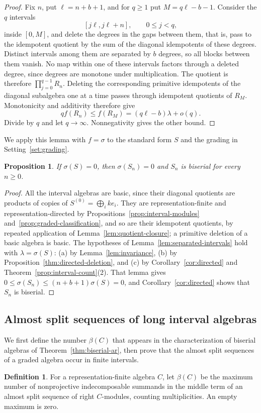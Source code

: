 \documentclass[a4paper,reqno,10pt]{amsart}
\newtheorem{proposition}[theorem]{Proposition}
\theoremstyle{definition}
\newtheorem{definition}[theorem]{Definition}
\numberwithin{equation}{section}
\begin{document}
\begin{proof}
Fix \(n\), put \(\ell=n+b+1\), and for \(q\geq1\) put
\(M=q\ell-b-1\). Consider the \(q\) intervals
\[
 [j\ell,j\ell+n],\qquad 0\leq j<q,
\]
inside \([0,M]\), and delete the degrees in the gaps between them, that is, pass to
the idempotent quotient by the sum of the diagonal idempotents of these
degrees.
Distinct intervals among them are separated by \(b\) degrees, so all
blocks between them vanish. No map within one of these intervals factors
through a deleted degree, since degrees are monotone under multiplication.
The quotient is therefore \(\prod_{j=0}^{q-1}R_n\).
Deleting the corresponding primitive idempotents of the diagonal
subalgebra one at a time passes through idempotent quotients of \(R_M\).
Monotonicity and additivity therefore give
\[
 qf(R_n)\leq f(R_M)=(q\ell-b)\lambda+o(q).
\]
Divide by \(q\) and let \(q\to\infty\). Nonnegativity gives the other bound.
\end{proof}

We apply this lemma with \(f=\sigma\) to the standard form \(S\) and
the grading in Setting~\ref{set:grading}.
\begin{proposition}\label{prop:interval-equality}
If \(\sigma(S)=0\), then \(\sigma(S_n)=0\) and \(S_n\) is biserial for
every \(n\geq0\).
\end{proposition}
\begin{proof}
All the interval algebras are basic, since their diagonal quotients are
products of copies of \(S^{(0)}=\bigoplus_i ke_i\). They are
representation-finite and representation-directed by
Propositions~\ref{prop:interval-modules}
and~\ref{prop:graded-classification},
and so are their idempotent quotients, by repeated application of
Lemma~\ref{lem:quotient-closure}; a primitive deletion of a basic
algebra is basic.
The hypotheses of Lemma~\ref{lem:separated-intervals} hold with
\(\lambda=\sigma(S)\): (a) by Lemma~\ref{lem:invariance},
(b) by Proposition~\ref{thm:directed-deletion}, and (c) by
Corollary~\ref{cor:directed} and Theorem~\ref{prop:interval-count}(2).
That lemma gives \(0\leq\sigma(S_n)\leq(n+b+1)\sigma(S)=0\), and
Corollary~\ref{cor:directed} shows that \(S_n\) is biserial.
\end{proof}

\subsection{Almost split sequences of long interval algebras}\label{subsec:ar-equality}
We first define the number \(\beta(C)\) that appears in the
characterization of biserial algebras of Theorem~\ref{thm:biserial-ar},
then prove that the almost split sequences of a graded algebra occur in
finite intervals.
\begin{definition}\label{def:beta}
For a representation-finite algebra \(C\), let \(\beta(C)\) be the
maximum number of nonprojective indecomposable summands in the middle
term of an almost split sequence of right \(C\)-modules, counting
multiplicities. An empty maximum is zero.
\end{definition}
\end{document}
